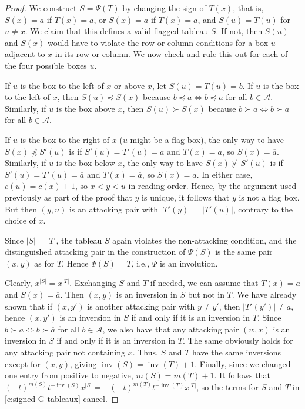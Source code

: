 \documentclass[12pt]{amsart}
\theoremstyle{definition}
\theoremstyle{remark}
\newcommand{\Acal}{{\mathcal A}}
\newcommand{\sgngt}{\succ}
\newcommand{\sgnle}{\preccurlyeq}
\DeclareMathOperator{\inv}{inv}
\begin{document}
\begin{proof}
We construct $S = \Psi (T)$ by changing the sign of $T(x)$, that is,
$S(x) = a$ if $T(x)=\overline{a}$, or $S(x) = \overline{a}$ if $T(x) =
a$, and $S(u) = T(u)$ for $u\not =x$.  We claim that this defines a
valid flagged tableau $S$.  If not, then $S(u)$ and $S(x)$ would have
to violate the row or column conditions for a box $u$ adjacent to $x$
in its row or column.  We now check and rule this out for each of the
four possible boxes $u$.

If $u$ is the box to the left of $x$ or above $x$, let $S(u) = T(u) =
b$.  If $u$ is the box to the left of $x$, then $S(u) \sgnle S(x)$
because $b\sgnle a \Leftrightarrow b \sgnle \overline{a}$ for all
$b\in \Acal $.  Similarly, if $u$ is the box above $x$, then $S(u)
\sgngt S(x)$ because $b\sgngt a \Leftrightarrow b \sgngt \overline{a}$
for all $b\in \Acal $.

If $u$ is the box to the right of $x$ ($u$ might be a flag box), the
only way to have $S(x) \not \sgnle S'(u)$ is if $S'(u) = T'(u) = a$
and $T(x) = a$, so $S(x) = \overline{a}$.  Similarly, if $u$ is the
box below $x$, the only way to have $S(x) \not \sgngt S'(u)$ is if
$S'(u) = T'(u) = \overline{a}$ and $T(x) = \overline{a}$, so $S(x) =
a$.  In either case, $c(u) = c(x)+1$, so $x<y<u$ in reading order.
Hence, by the argument used previously as part of the proof that $y$
is unique, it follows that $y$ is not a flag box.  But then $(y,u)$ is
an attacking pair with $|T'(y)| = |T'(u)|$, contrary to the choice of
$x$.

Since $|S| = |T|$, the tableau $S$ again violates the non-attacking
condition, and the distinguished attacking pair in the construction of
$\Psi (S)$ is the same pair $(x,y)$ as for $T$.  Hence $\Psi (S) = T$,
i.e., $\Psi $ is an involution.

Clearly, $x^{|S|} = x^{|T|}$.  Exchanging $S$ and $T$ if needed, we
can assume that $T(x) = a$ and $S(x) = \overline{a}$.  Then $(x,y)$ is
an inversion in $S$ but not in $T$.  We have already shown that if
$(x,y')$ is another attacking pair with $y\not =y'$, then $|T'(y')|
\not = a$, hence $(x,y')$ is an inversion in $S$ if and only if it is
an inversion in $T$.  Since $b \sgngt a \Leftrightarrow b \sgngt
\overline{a}$ for all $b\in \Acal $, we also have that any attacking
pair $(w,x)$ is an inversion in $S$ if and only if it is an inversion
in $T$.  The same obviously holds for any attacking pair not
containing $x$.  Thus, $S$ and $T$ have the same inversions except for
$(x,y)$, giving $\inv (S) = \inv (T)+1$.  Finally, since we changed
one entry from positive to negative, $m(S) = m(T)+1$.  It follows that
$(-t)^{m(S)} t^{-\inv (S)} x^{|S|} = - (-t)^{m(T)} t^{-\inv (T)}
x^{|T|}$, so the terms for $S$ and $T$ in \eqref{e:signed-G-tableaux}
cancel.
\end{proof}
\end{document}
